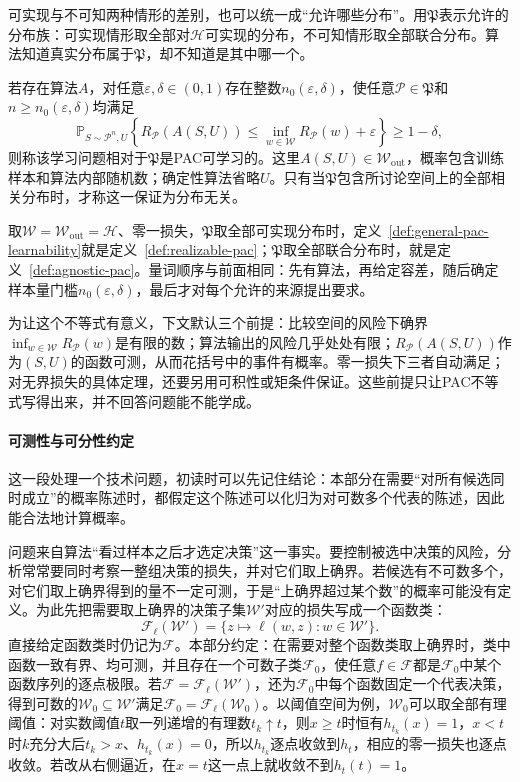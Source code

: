 可实现与不可知两种情形的差别，也可以统一成“允许哪些分布”。用$\mathfrak P$表示允许的分布族：可实现情形取全部对$\mathcal H$可实现的分布，不可知情形取全部联合分布。算法知道真实分布属于$\mathfrak P$，却不知道是其中哪一个。

\begin{definition}[相对于分布族的PAC可学习性]
\label{def:general-pac-learnability}
若存在算法$A$，对任意$\varepsilon,\delta\in(0,1)$存在整数$n_0(\varepsilon,\delta)$，使任意$\mathcal P\in\mathfrak P$和$n\geq n_0(\varepsilon,\delta)$均满足
\[
 \mathbb P_{S\sim\mathcal P^n,U}\!\left\{
 R_{\mathcal P}(A(S,U))\leq
 \inf_{w\in\mathcal W}R_{\mathcal P}(w)+\varepsilon
 \right\}\geq1-\delta,
\]
则称该学习问题相对于$\mathfrak P$是PAC可学习的。这里$A(S,U)\in\mathcal W_{\mathrm{out}}$，概率包含训练样本和算法内部随机数；确定性算法省略$U$。只有当$\mathfrak P$包含所讨论空间上的全部相关分布时，才称这一保证为分布无关。
\end{definition}

取$\mathcal W=\mathcal W_{\mathrm{out}}=\mathcal H$、零一损失，$\mathfrak P$取全部可实现分布时，定义~\ref{def:general-pac-learnability}就是定义~\ref{def:realizable-pac}；$\mathfrak P$取全部联合分布时，就是定义~\ref{def:agnostic-pac}。量词顺序与前面相同：先有算法，再给定容差，随后确定样本量门槛$n_0(\varepsilon,\delta)$，最后才对每个允许的来源提出要求。

为让这个不等式有意义，下文默认三个前提：比较空间的风险下确界$\inf_{w\in\mathcal W}R_{\mathcal P}(w)$是有限的数；算法输出的风险几乎处处有限；$R_{\mathcal P}(A(S,U))$作为$(S,U)$的函数可测，从而花括号中的事件有概率。零一损失下三者自动满足；对无界损失的具体定理，还要另用可积性或矩条件保证。这些前提只让PAC不等式写得出来，并不回答问题能不能学成。

\paragraph{可测性与可分性约定}
\label{sec:measurability-convention}

这一段处理一个技术问题，初读时可以先记住结论：本部分在需要“对所有候选同时成立”的概率陈述时，都假定这个陈述可以化归为对可数多个代表的陈述，因此能合法地计算概率。

问题来自算法“看过样本之后才选定决策”这一事实。要控制被选中决策的风险，分析常常要同时考察一整组决策的损失，并对它们取上确界。若候选有不可数多个，对它们取上确界得到的量不一定可测，于是“上确界超过某个数”的概率可能没有定义。为此先把需要取上确界的决策子集$\mathcal W'$对应的损失写成一个函数类：
\[
 \mathcal F_\ell(\mathcal W')
 =\{z\mapsto\ell(w,z):w\in\mathcal W'\}.
\]
直接给定函数类时仍记为$\mathcal F$。本部分约定：在需要对整个函数类取上确界时，类中函数一致有界、均可测，并且存在一个可数子类$\mathcal F_0$，使任意$f\in\mathcal F$都是$\mathcal F_0$中某个函数序列的逐点极限。若$\mathcal F=\mathcal F_\ell(\mathcal W')$，还为$\mathcal F_0$中每个函数固定一个代表决策，得到可数的$\mathcal W_0\subseteq\mathcal W'$满足$\mathcal F_0=\mathcal F_\ell(\mathcal W_0)$。以阈值空间为例，$\mathcal W_0$可以取全部有理阈值：对实数阈值$t$取一列递增的有理数$t_k\uparrow t$，则$x\geq t$时恒有$h_{t_k}(x)=1$，$x<t$时$k$充分大后$t_k>x$、$h_{t_k}(x)=0$，所以$h_{t_k}$逐点收敛到$h_t$，相应的零一损失也逐点收敛。若改从右侧逼近，在$x=t$这一点上就收敛不到$h_t(t)=1$。

